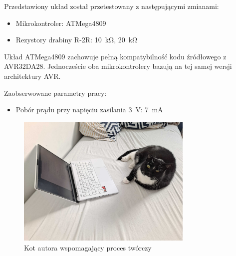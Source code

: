 \documentclass[12pt, a4paper]{article}
\begin{document}
Przedstawiony układ został przetestowany z następującymi zmianami:

\begin{itemize}
	\item Mikrokontroler: ATMega4809
	\item Rezystory drabiny R-2R: \qty{10}{\kohm}, \qty{20}{\kohm}
\end{itemize}

Układ ATMega4809 zachowuje pełną kompatybilność kodu źródłowego z AVR32DA28. 
Jednoczeście oba mikrokontrolery bazują na tej samej wersji architektury AVR.

Zaobserwowane parametry pracy:
\begin{itemize}
	\item Pobór prądu przy napięciu zasilania \qty{3}{\V}: \qty{7}{\mA}
\end{itemize}


\newpage
\printbibliography[title=Źródła] %

\newpage

\begin{figure}
	\centering
	\includegraphics[width=0.75\textwidth]{img/kot_enter.jpg}
	\caption{Kot autora wspomagający proces twórczy}
\end{figure}
\end{document}
